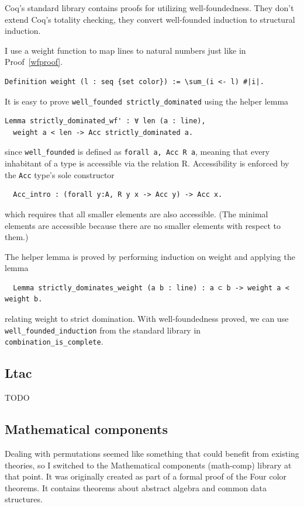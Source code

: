\documentclass[english, 12pt, a4paper, sci, a-1b, online]{aaltothesis}
\newcommand\icoq[1]{\texttt{#1}}
\begin{document}
Coq's standard library contains proofs for utilizing well-foundedness. They don't extend Coq's totality checking, they convert well-founded induction to structural induction.

I use a weight function to map lines to natural numbers just like in Proof~\ref{wfproof}.
\begin{verbatim}
Definition weight (l : seq {set color}) := \sum_(i <- l) #|i|.
\end{verbatim}
It is easy to prove \icoq{well_founded strictly_dominated} using the helper lemma
\begin{verbatim}
Lemma strictly_dominated_wf' : ∀ len (a : line),
  weight a < len -> Acc strictly_dominated a.
\end{verbatim}
since \icoq{well_founded} is defined as \icoq{forall a, Acc R a}, meaning that every inhabitant of a type is accessible via the relation R. Accessibility is enforced by the \icoq{Acc} type's sole constructor
\begin{verbatim}
  Acc_intro : (forall y:A, R y x -> Acc y) -> Acc x.
\end{verbatim}
which requires that all smaller elements are also accessible. (The minimal elements are accessible because there are no smaller elements with respect to them.)

The helper lemma is proved by performing induction on weight and applying the lemma
\begin{verbatim}
  Lemma strictly_dominates_weight (a b : line) : a ⊂ b -> weight a < weight b.
\end{verbatim}
relating weight to strict domination. With well-foundedness proved, we can use \icoq{well_founded_induction} from the standard library in \icoq{combination_is_complete}.

\subsection{Ltac}

TODO

\subsection{Mathematical components}

Dealing with permutations seemed like something that could benefit from existing theories, so I switched to the Mathematical components (math-comp) library at that point. It was originally created as part of a formal proof of the Four color theorems. It contains theorems about abstract algebra and common data structures.
\end{document}
